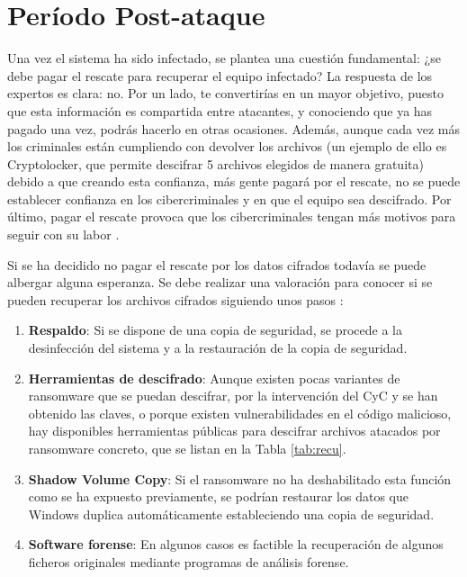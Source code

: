 \section{Período Post-ataque}\label{sec:2-10}
\noindent Una vez el sistema ha sido infectado, se plantea una cuestión fundamental: ¿se debe pagar el rescate para recuperar el equipo infectado? La respuesta de los expertos es clara: no. Por un lado, te convertirías en un mayor objetivo, puesto que esta información es compartida entre atacantes, y conociendo que ya has pagado una vez, podrás hacerlo en otras ocasiones. Además, aunque cada vez más los criminales están cumpliendo con devolver los archivos (un ejemplo de ello es Cryptolocker, que permite descifrar 5 archivos elegidos de manera gratuita) debido a que creando esta confianza, más gente pagará por el rescate,  no se puede establecer confianza en los cibercriminales y en que el equipo sea descifrado. Por último, pagar el rescate provoca que los cibercriminales tengan más motivos para seguir con su labor \cite{TOPAYORNOT}. 

Si se ha decidido no pagar el rescate por los datos cifrados todavía se puede albergar alguna esperanza. Se debe realizar una valoración para conocer si se pueden recuperar los archivos cifrados siguiendo unos pasos \cite{CcnCert}:
\begin{enumerate}
    \item \textbf{Respaldo}: Si se dispone de una copia de seguridad, se procede a la desinfección del sistema y a la restauración de la copia de seguridad.
    \item \textbf{Herramientas de descifrado}: Aunque existen pocas variantes de ransomware que se puedan descifrar, por la intervención del \gls{CyC} y se han obtenido las claves, o porque existen vulnerabilidades en el código malicioso, hay disponibles herramientas públicas para descifrar archivos atacados por ransomware concreto, que se listan en la Tabla \ref{tab:recu}.
    

    \item \textbf{Shadow Volume Copy}: Si el ransomware no ha deshabilitado esta función como se ha expuesto previamente, se podrían restaurar los datos que Windows duplica automáticamente estableciendo una copia de seguridad.
    \item \textbf{Software forense}: En algunos casos es factible la recuperación de algunos ficheros originales mediante programas de análisis forense.
\end{enumerate}



